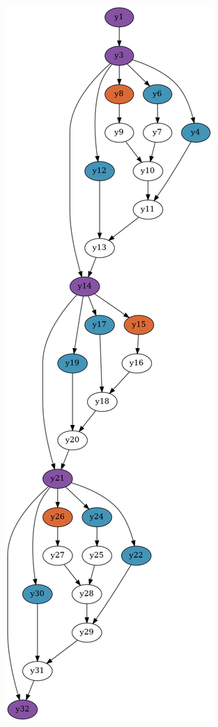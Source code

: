 \documentclass[../thesis.tex]{subfiles}
\begin{document}
\begin{figure}[htbp]
  \begin{adjustwidth}{-2cm}{-2cm}
    \centering
    \begin{subfigure}{0.28\textwidth}
      \centering
    \includegraphics[width=\textwidth]{graph_simple2c.png} 

\end{subfigure}
\end{adjustwidth}
\end{figure}
\end{document}
